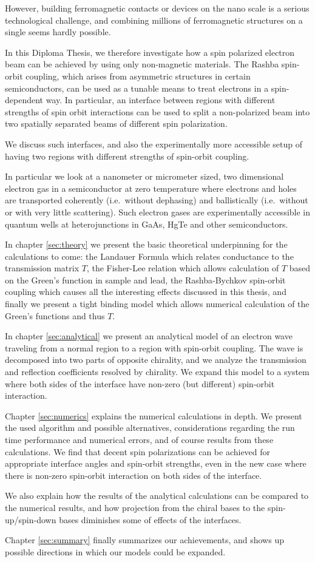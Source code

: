 However, building ferromagnetic contacts or devices on
the nano scale is a serious technological challenge, and combining millions of
ferromagnetic structures on a single seems hardly possible.

In this Diploma Thesis, we therefore investigate how a spin polarized electron
beam can be achieved by using only non-magnetic materials. The Rashba 
spin-orbit coupling, which arises from
asymmetric structures in certain semiconductors, can be used as a tunable
means to treat
electrons in a spin-dependent way. In particular, an interface
between regions with different strengths of spin orbit interactions can be
used to split a non-polarized beam into two spatially separated beams of
different spin polarization.

We discuss such interfaces, and also the experimentally more accessible setup
of having two regions with different strengths of spin-orbit coupling.

In particular we look at a nanometer or micrometer sized, two dimensional
electron gas in a semiconductor at zero temperature where electrons and holes
are transported coherently (i.e.~without dephasing) and ballistically
(i.e.~without or with very little scattering). Such electron gases are
experimentally accessible in quantum wells at heterojunctions in GaAs,
HgTe and other semiconductors.

In chapter \ref{sec:theory} we present the basic theoretical underpinning for
the calculations to come: the Landauer Formula which relates conductance to
the transmission matrix $T$, the Fisher-Lee relation which allows calculation
of $T$ based on the Green's function in sample and lead, the Rashba-Bychkov
spin-orbit coupling which causes all the interesting effects discussed in this
thesis, and finally we present a tight binding model which allows numerical
calculation of the Green's functions and thus $T$.

In chapter \ref{sec:analytical} we present an analytical model of an electron
wave traveling from a normal region to a region with spin-orbit coupling. The
wave is decomposed into two parts of opposite chirality, and we 
analyze the transmission and reflection coefficients resolved by chirality.
We expand this model to a system where both sides of the interface have
non-zero (but different) spin-orbit interaction.

Chapter \ref{sec:numerics} explains the numerical calculations in depth. We
present the used algorithm and possible alternatives, considerations regarding
the run time performance and numerical errors, and of course results from
these calculations. We find that decent spin polarizations can be achieved
for appropriate interface angles and spin-orbit strengths, even in the new
case where there is non-zero spin-orbit interaction on both sides of
the interface.

We also explain how the results of the analytical calculations can be compared
to the numerical results, and how projection from the chiral bases to the
spin-up/spin-down bases diminishes some of effects of the interfaces.

Chapter \ref{sec:summary} finally summarizes our achievements, and shows up
possible directions in which our models could be expanded.

